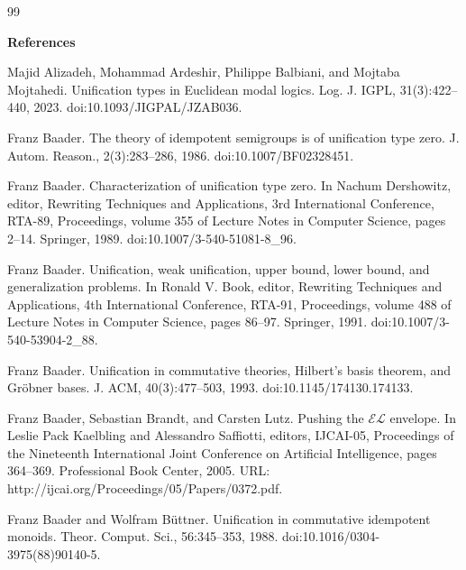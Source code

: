 \documentclass[10pt,a4paper]{amsart}
\begin{document}
\begin{thebibliography}{99}

 
\par\medskip\noindent\textbf{References}\par
  
\par\noindent  [1]  Majid Alizadeh, Mohammad Ardeshir, Philippe Balbiani, and Mojtaba Mojtahedi.  Unification types in Euclidean modal logics.  Log. J. IGPL, 31(3):422–440, 2023.  doi:10.1093/JIGPAL/JZAB036.  
 
\par\noindent  [2]  Franz Baader.  The theory of idempotent semigroups is of unification type zero.  J. Autom. Reason., 2(3):283–286, 1986.  doi:10.1007/BF02328451.  
 
\par\noindent  [3]  Franz Baader.  Characterization of unification type zero.  In Nachum Dershowitz, editor, Rewriting Techniques and Applications, 3rd International Conference, RTA-89, Proceedings, volume 355 of Lecture Notes in Computer Science, pages 2–14. Springer, 1989.  doi:10.1007/3-540-51081-8\_96.  
 
\par\noindent  [4]  Franz Baader.  Unification, weak unification, upper bound, lower bound, and generalization problems.  In Ronald V. Book, editor, Rewriting Techniques and Applications, 4th International Conference, RTA-91, Proceedings, volume 488 of Lecture Notes in Computer Science, pages 86–97. Springer, 1991.  doi:10.1007/3-540-53904-2\_88.  
 
\par\noindent  [5]  Franz Baader.  Unification in commutative theories, Hilbert’s basis theorem, and Gröbner bases.  J. ACM, 40(3):477–503, 1993.  doi:10.1145/174130.174133.  
 
\par\noindent  [6]  Franz Baader, Sebastian Brandt, and Carsten Lutz.  Pushing the $\mathcal{EL}$ envelope.  In Leslie Pack Kaelbling and Alessandro Saffiotti, editors, IJCAI-05, Proceedings of the Nineteenth International Joint Conference on Artificial Intelligence, pages 364–369. Professional Book Center, 2005.  URL: http://ijcai.org/Proceedings/05/Papers/0372.pdf.  
 
\par\noindent  [7]  Franz Baader and Wolfram Büttner.  Unification in commutative idempotent monoids.  Theor. Comput. Sci., 56:345–353, 1988.  doi:10.1016/0304-3975(88)90140-5.  
 

\end{thebibliography}
\end{document}
